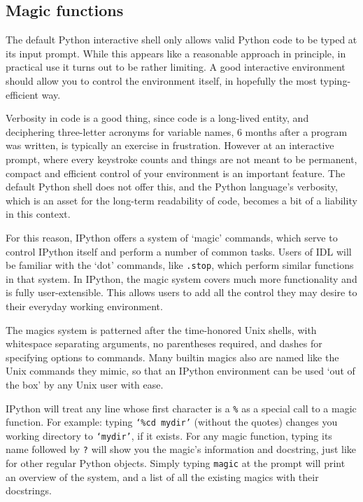 \subsection{Magic functions}

The default Python interactive shell only allows valid Python code
to be typed at its input prompt. While this appears like a reasonable
approach in principle, in practical use it turns out to be rather
limiting. A good interactive environment should allow you to control
the environment itself, in hopefully the most typing-efficient way. 

Verbosity in code is a good thing, since code is a long-lived entity,
and deciphering three-letter acronyms for variable names, 6 months
after a program was written, is typically an exercise in frustration.
However at an interactive prompt, where every keystroke counts and
things are not meant to be permanent, compact and efficient control
of your environment is an important feature. The default Python shell
does not offer this, and the Python language's verbosity, which is
an asset for the long-term readability of code, becomes a bit of a
liability in this context.

For this reason, IPython offers a system of `magic' commands, which
serve to control IPython itself and perform a number of common tasks.
Users of IDL will be familiar with the `dot' commands, like \texttt{.stop},
which perform similar functions in that system. In IPython, the magic
system covers much more functionality and is fully user-extensible.
This allows users to add all the control they may desire to their
everyday working environment. 

The magics system is patterned after the time-honored Unix shells,
with whitespace separating arguments, no parentheses required, and
dashes for specifying options to commands. Many builtin magics also
are named like the Unix commands they mimic, so that an IPython environment
can be used `out of the box' by any Unix user with ease.

IPython will treat any line whose first character is a \texttt{\%}
as a special call to a magic function. For example: typing \texttt{`\%cd
mydir'} (without the quotes) changes you working directory to \texttt{`mydir'},
if it exists. For any magic function, typing its name followed by
\texttt{?} will show you the magic's information and docstring, just
like for other regular Python objects. Simply typing \texttt{magic}
at the prompt will print an overview of the system, and a list of
all the existing magics with their docstrings.

